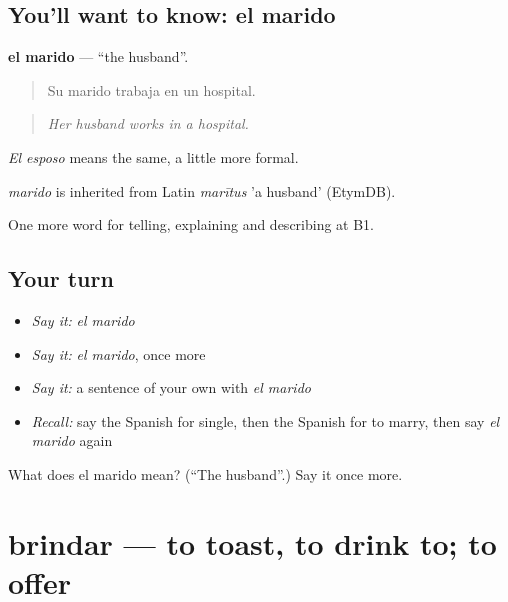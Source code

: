 \subsection*{You'll want to know: el marido}
\textbf{el marido} — \textquotedblleft{}the husband\textquotedblright{}.

\begin{quote}
Su marido trabaja en un hospital.
\end{quote}

\begin{quote}
\emph{Her husband works in a hospital.}
\end{quote}

\emph{El esposo} means the same, a little more formal.

\begin{cousinweb}
\emph{marido} is inherited from Latin \emph{marītus} 'a husband' (EtymDB).
\end{cousinweb}

\begin{grammarlens}[title={What you've built}]
One more word for telling, explaining and describing at B1.
\end{grammarlens}

\subsection*{Your turn}
\begin{itemize}
\raggedright
  \item \emph{Say it:} \emph{el marido}
  \item \emph{Say it:} \emph{el marido}, once more
  \item \emph{Say it:} a sentence of your own with \emph{el marido}
  \item \emph{Recall:} say the Spanish for single, then the Spanish for to marry, then say \emph{el marido} again
\end{itemize}

\begin{tcolorbox}[breakable,colback=teal!4,colframe=teal!35!black,title={Before you move on}]
What does el marido mean? (\textquotedblleft{}The husband\textquotedblright{}.) Say it once more.
\end{tcolorbox}
\section[brindar]{brindar — to toast, to drink to; to offer}

\label{lesson:ES-C549-brindar}




